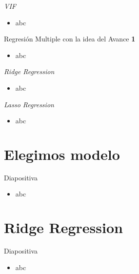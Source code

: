 \documentclass[11pt]{beamer}
\begin{document}
\begin{frame}{\textit{VIF}}
	\begin{itemize}
		\item abc
	\end{itemize}
\end{frame}

\begin{frame}{Regresión Multiple con la idea del Avance \textbf{1}}
	\begin{itemize}
		\item abc
	\end{itemize}
\end{frame}

\begin{frame}{\textit{Ridge Regression}}
	\begin{itemize}
		\item abc
	\end{itemize}
\end{frame}

\begin{frame}{\textit{Lasso Regression}}
	\begin{itemize}
		\item abc
	\end{itemize}
\end{frame}


\section{Elegimos modelo}

\begin{frame}{Diapositiva}
	\begin{itemize}
		\item abc
	\end{itemize}
\end{frame}


\section{Ridge Regression}

\begin{frame}{Diapositiva}
	\begin{itemize}
		\item abc
	\end{itemize}
\end{frame}
\end{document}

